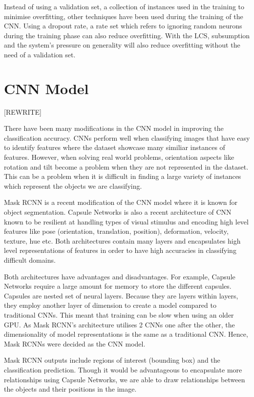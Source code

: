 Instead of using a validation set, a collection of instances used in the training to minimise overfitting, other techniques have been used during the training of the CNN. Using a dropout rate, a rate set which refers to ignoring random neurons during the training phase can also reduce overfitting. With the LCS, subsumption and the system’s pressure on generality will also reduce overfitting without the need of a validation set.

\section{CNN Model}

[REWRITE]

There have been many modifications in the CNN model in improving the classification accuracy. CNNs perform well when classifying images that have easy to identify features where the dataset showcase many similiar instances of features. However, when solving real world problems, orientation aspects like rotation and tilt become a problem when they are not represented in the dataset. This can be a problem when it is difficult in finding a large variety of instances which represent the objects we are classifying.


Mask RCNN is a recent modification of the CNN model where it is known for object segmentation. 
Capsule Networks is also a recent architecture of CNN known to be resilient at handling types of visual stimulus and encoding high level features like pose (orientation, translation, position), deformation, velocity, texture, hue etc. Both architectures contain many layers and encapsulates high level representations of features in order to have high accuracies in classifying difficult domains.

Both architectures have advantages and disadvantages. For example, Capsule Networks require a large amount for memory to store the different capsules. Capsules are nested set of neural layers. Because they are layers within layers, they employ another layer of dimension to create a model compared to traditional CNNs. This meant that training can be slow when using an older GPU. As Mask RCNN's architecture utilises 2 CNNs one after the other, the dimensionality of model representations is the same as a traditional CNN. Hence, Mask RCNNs were decided as the CNN model. 

Mask RCNN outputs include regions of interest (bounding box) and the classification prediction. Though it would be advantageous to encapsulate more relationships using Capsule Networks, we are able to draw relationships between the objects and their positions in the image.

